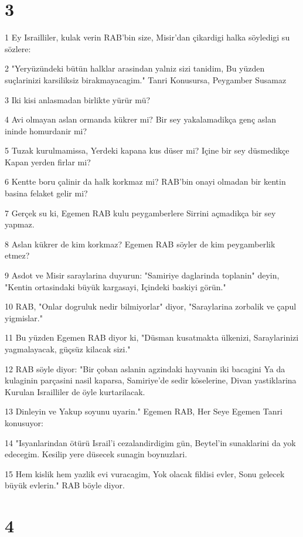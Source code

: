 \chapter{3}

\par 1 Ey Israilliler, kulak verin RAB'bin size, Misir'dan çikardigi halka söyledigi su sözlere:
\par 2 "Yeryüzündeki bütün halklar arasindan yalniz sizi tanidim, Bu yüzden suçlarinizi karsiliksiz birakmayacagim." Tanri Konusursa, Peygamber Susamaz
\par 3 Iki kisi anlasmadan birlikte yürür mü?
\par 4 Avi olmayan aslan ormanda kükrer mi? Bir sey yakalamadikça genç aslan ininde homurdanir mi?
\par 5 Tuzak kurulmamissa, Yerdeki kapana kus düser mi? Içine bir sey düsmedikçe Kapan yerden firlar mi?
\par 6 Kentte boru çalinir da halk korkmaz mi? RAB'bin onayi olmadan bir kentin basina felaket gelir mi?
\par 7 Gerçek su ki, Egemen RAB kulu peygamberlere Sirrini açmadikça bir sey yapmaz.
\par 8 Aslan kükrer de kim korkmaz? Egemen RAB söyler de kim peygamberlik etmez?
\par 9 Asdot ve Misir saraylarina duyurun: "Samiriye daglarinda toplanin" deyin, "Kentin ortasindaki büyük kargasayi, Içindeki baskiyi görün."
\par 10 RAB, "Onlar dogruluk nedir bilmiyorlar" diyor, "Saraylarina zorbalik ve çapul yigmislar."
\par 11 Bu yüzden Egemen RAB diyor ki, "Düsman kusatmakta ülkenizi, Saraylarinizi yagmalayacak, güçsüz kilacak sizi."
\par 12 RAB söyle diyor: "Bir çoban aslanin agzindaki hayvanin iki bacagini Ya da kulaginin parçasini nasil kaparsa, Samiriye'de sedir köselerine, Divan yastiklarina Kurulan Israilliler de öyle kurtarilacak.
\par 13 Dinleyin ve Yakup soyunu uyarin." Egemen RAB, Her Seye Egemen Tanri konusuyor:
\par 14 "Isyanlarindan ötürü Israil'i cezalandirdigim gün, Beytel'in sunaklarini da yok edecegim. Kesilip yere düsecek sunagin boynuzlari.
\par 15 Hem kislik hem yazlik evi vuracagim, Yok olacak fildisi evler, Sonu gelecek büyük evlerin." RAB böyle diyor.

\chapter{4}

